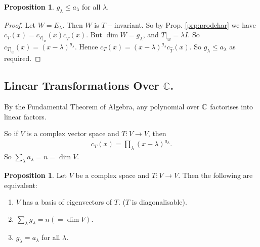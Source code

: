 \documentclass{article}
\theoremstyle{definition} \newtheorem*{definition}{Definition}
\newtheorem{proposition}[theorem]{Proposition}
\begin{document}
\begin{proposition}
  $g_\lambda \leq a_\lambda$ for all $\lambda$.
\end{proposition}

\begin{proof}
  Let $W = E_\lambda$. Then $W$ is $T-$invariant. So by Prop. \ref{prp:prodchar} we have $c_T(x)=c_{T|_w}(x)c_{\hat{T}}(x)$. But $\dim W = g_\lambda$,
  and $T|_w = \lambda I$. So $c_{T|_w}(x) = (x - \lambda)^{g_\lambda}$.
  Hence $c_T(x)=(x-\lambda)^{g_\lambda}c_{\hat{T}}(x)$. 
  So $g_\lambda \leq a_\lambda$ as required.
\end{proof}

\subsection{Linear Transformations Over $\mathbb{C}$.}

By the Fundamental Theorem of Algebra, any polynomial over $\mathbb{C}$ 
factorises into linear factors.

So if $V$ is a complex vector space and $T:V \rightarrow V$, then
\begin{align*}
  c_T(x) = \prod_\lambda (x - \lambda)^{a_\lambda}.
\end{align*}
So $\sum_\lambda a_\lambda = n = \dim V$.

\begin{proposition}
  Let $V$ be a complex space and $T : V \rightarrow V$. Then the following
  are equivalent:
  \begin{enumerate}
    \item $V$ has a basis of eigenvectors of $T$. ($T$ is diagonalisable).
    \item $\sum_\lambda g_\lambda = n (= \dim V)$.
    \item $g_\lambda = a_\lambda$ for all $\lambda$.
  \end{enumerate}
\end{proposition}
\end{document}
